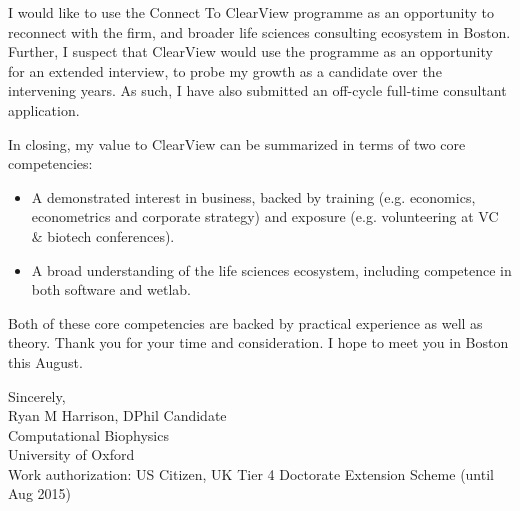 \documentclass{../res}
\begin{document}
\begin{sloppypar}
\begin{resume}
I would like to use the Connect To ClearView programme as an opportunity to reconnect with the firm, and broader life sciences consulting ecosystem in Boston. Further, I suspect that ClearView would use the programme as an opportunity for an extended interview, to probe my growth as a candidate over the intervening years. As such, I have also submitted an off-cycle full-time consultant application.

In closing, my value to ClearView can be summarized in terms of two core competencies: 
\begin{itemize}
    \item A demonstrated interest in business, backed by training (e.g. economics, econometrics and corporate strategy) and exposure (e.g. volunteering at VC \& biotech conferences).
    \item A broad understanding of the life sciences ecosystem, including competence in both software and wetlab.
\end{itemize}
Both of these core competencies are backed by practical experience as well as theory. Thank you for your time and consideration. I hope to meet you in Boston this August.

Sincerely, \\
Ryan M Harrison, DPhil Candidate \\
Computational Biophysics \\
University of Oxford  \\
Work authorization: US Citizen, UK Tier 4 Doctorate Extension Scheme (until Aug 2015)
\end{resume} 
\end{sloppypar}
\end{document}
